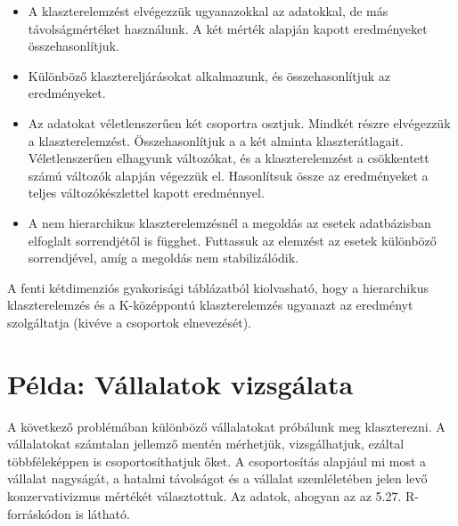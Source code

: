 \documentclass[
  letterpaper,
]{krantz}
\makeatletter
\newenvironment{Shaded}{\begin{snugshade}}{\end{snugshade}}
\newcommand{\CommentTok}[1]{\textcolor[rgb]{0.37,0.37,0.37}{#1}}
\newcommand{\FunctionTok}[1]{\textcolor[rgb]{0.28,0.35,0.67}{#1}}
\newcommand{\NormalTok}[1]{\textcolor[rgb]{0.00,0.23,0.31}{#1}}
\newcommand{\SpecialCharTok}[1]{\textcolor[rgb]{0.37,0.37,0.37}{#1}}
\providecommand{\tightlist}{%
  \setlength{\itemsep}{0pt}\setlength{\parskip}{0pt}}\usepackage{longtable,booktabs,array}
\newenvironment{kframe}{%
\medskip{}
\setlength{\fboxsep}{.8em}
 \def\at@end@of@kframe{}%
 \ifinner\ifhmode%
  \def\at@end@of@kframe{\end{minipage}}%
  \begin{minipage}{\columnwidth}%
 \fi\fi%
 \def\FrameCommand##1{\hskip\@totalleftmargin \hskip-\fboxsep
 \colorbox{shadecolor}{##1}\hskip-\fboxsep
     \hskip-\linewidth \hskip-\@totalleftmargin \hskip\columnwidth}%
 \MakeFramed {\advance\hsize-\width
   \@totalleftmargin\z@ \linewidth\hsize
   \@setminipage}}%
 {\par\unskip\endMakeFramed%
 \at@end@of@kframe}
\renewenvironment{Shaded}{\begin{kframe}}{\end{kframe}}
\makeatother
\begin{document}
\begin{itemize}
\tightlist
\item
  A klaszterelemzést elvégezzük ugyanazokkal az adatokkal, de más
  távolságmértéket használunk. A két mérték alapján kapott eredményeket
  összehasonlítjuk.
\item
  Különböző klasztereljárásokat alkalmazunk, és összehasonlítjuk az
  eredményeket.
\item
  Az adatokat véletlenszerűen két csoportra osztjuk. Mindkét részre
  elvégezzük a klaszterelemzést. Összehasonlítjuk a a két alminta
  klaszterátlagait. Véletlenszerűen elhagyunk változókat, és a
  klaszterelemzést a csökkentett számú változók alapján végezzük el.
  Hasonlítsuk össze az eredményeket a teljes változókészlettel kapott
  eredménnyel.
\item
  A nem hierarchikus klaszterelemzésnél a megoldás az esetek
  adatbázisban elfoglalt sorrendjétől is függhet. Futtassuk az elemzést
  az esetek különböző sorrendjével, amíg a megoldás nem stabilizálódik.
\end{itemize}

\begin{Shaded}
\end{Shaded}

A fenti kétdimenziós gyakorisági táblázatból kiolvasható, hogy a
hierarchikus klaszterelemzés és a K-középpontú klaszterelemzés ugyanazt
az eredményt szolgáltatja (kivéve a csoportok elnevezését).

\hypertarget{puxe9lda-vuxe1llalatok-vizsguxe1lata}{%
\section{Példa: Vállalatok
vizsgálata}\label{puxe9lda-vuxe1llalatok-vizsguxe1lata}}

A következő problémában különböző vállalatokat próbálunk meg
klaszterezni. A vállalatokat számtalan jellemző mentén mérhetjük,
vizsgálhatjuk, ezáltal többféleképpen is csoportosíthatjuk őket. A
csoportosítás alapjául mi most a vállalat nagyságát, a hatalmi
távolságot és a vállalat szemléletében jelen levő konzervativizmus
mértékét választottuk. Az adatok, ahogyan az az 5.27. R-forráskódon is
látható.
\end{document}

